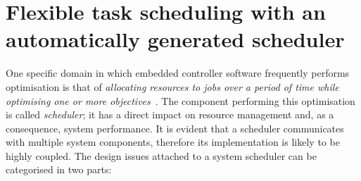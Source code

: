 	
	
	\section{Flexible task scheduling with an automatically generated scheduler}
	\label{sec:taskScheduling}
	\label{sec:problem}
	One specific domain in which embedded controller software frequently performs
	optimisation is that of \emph{allocating resources to jobs over a period of time
	while optimising one or more objectives}~\cite{Brucker:book}.
	The component performing this optimisation is called \emph{scheduler}; it has a
	direct impact on resource management and, as a consequence, system performance.
	It is evident that a scheduler communicates with multiple system components,
	therefore its implementation is likely to be highly coupled.
	The design issues attached to a system scheduler can be categorised in two
	parts:
	
